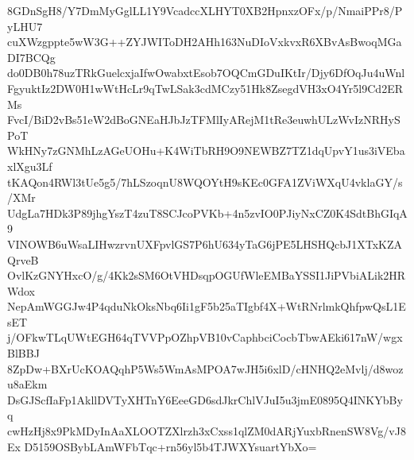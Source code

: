 8GDnSgH8/Y7DmMyGglLL1Y9VcadccXLHYT0XB2HpnxzOFx/p/NmaiPPr8/PyLHU7
cuXWzgppte5wW3G++ZYJWIToDH2AHh163NuDIoVxkvxR6XBvAsBwoqMGaDI7BCQg
do0DB0h78uzTRkGuelcxjaIfwOwabxtEsob7OQCmGDuIKtIr/Djy6DfOqJu4uWnl
FgyuktIz2DW0H1wWtHcLr9qTwLSak3cdMCzy51Hk8ZsegdVH3xO4Yr5l9Cd2ERMs
FvcI/BiD2vBs51eW2dBoGNEaHJbJzTFMlIyARejM1tRe3euwhULzWvIzNRHySPoT
WkHNy7zGNMhLzAGeUOHu+K4WiTbRH9O9NEWBZ7TZ1dqUpvY1us3iVEbaxlXgu3Lf
tKAQon4RWl3tUe5g5/7hLSzoqnU8WQOYtH9sKEc0GFA1ZViWXqU4vklaGY/s/XMr
UdgLa7HDk3P89jhgYszT4zuT8SCJcoPVKb+4n5zvIO0PJiyNxCZ0K4SdtBhGIqA9
VINOWB6uWsaLIHwzrvnUXFpvlGS7P6hU634yTaG6jPE5LHSHQcbJ1XTxKZAQrveB
OvlKzGNYHxcO/g/4Kk2sSM6OtVHDsqpOGUfWleEMBaYSSI1JiPVbiALik2HRWdox
NepAmWGGJw4P4qduNkOksNbq6Ii1gF5b25aTIgbf4X+WtRNrlmkQhfpwQsL1EsET
j/OFkwTLqUWtEGH64qTVVPpOZhpVB10vCaphbciCocbTbwAEki617nW/wgxBlBBJ
8ZpDw+BXrUcKOAQqhP5Ws5WmAsMPOA7wJH5i6xlD/cHNHQ2eMvlj/d8wozu8aEkm
DsGJScfIaFp1AkllDVTyXHTnY6EeeGD6sdJkrChlVJuI5u3jmE0895Q4INKYbByq
cwHzHj8x9PkMDyInAaXLOOTZXlrzh3xCxss1qlZM0dARjYuxbRnenSW8Vg/vJ8Ex
D5159OSBybLAmWFbTqc+rn56yl5b4TJWXYsuartYbXo=
